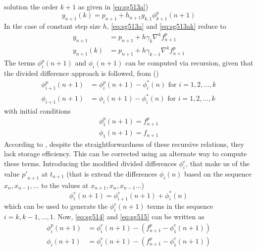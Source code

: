 solution the order $k+1$ as given in \autoref{eq:sg513a})
\begin{equation}\label{eq:sg513ak}
  y_{n+1}(k) = p_{n+1} + h_{n+1} g_{k,1} \phi ^{p}_{k+1} (n+1)
\end{equation}
In the case of constant step size $h$, \autoref{eq:sg513a} and \autoref{eq:sg513ak} 
reduce to
\begin{align}
  y_{n+1}    &= p_{n+1} + h \gamma _k \nabla ^{k} f^{p}_{n+1} \\
  y_{n+1}(k) &= p_{n+1} + h \gamma _{k-1} \nabla ^{k} f^{p}_{n+1}
\end{align}
The terms $\phi ^{p}_{i} (n+1)$ and $\phi _{i} (n+1)$ can be computed via recursion, 
given that the divided difference approach is followed, from (\cite{Shampine1975})
\begin{align}
  \phi ^{p}_{i+1} (n+1) &= \phi ^{p}_{i} (n+1) - \phi ^{*}_{i} (n) \mbox{  for } i=1,2,\dots ,k \label{eq:sg514}\\
  \phi _{i+1} (n+1)     &= \phi _{i} (n+1) - \phi ^{*}_{i} (n)     \mbox{  for } i=1,2,\dots ,k \label{eq:sg515}
\end{align}
with initial conditions
\begin{align}
  \phi ^{p}_{1} (n+1) = f_{n+1}^{p} \\
  \phi _{1} (n+1) = f_{n+1}
\end{align}
According to \cite{Shampine1975}, despite the straightforwardness of these recursive 
relations, they lack storage efficiency. This can be corrected using an alternate way 
to compute these terms. Introducing the modified divided differences $\phi ^{e}_{i}$, 
that make us of the value ${p'}_{n+1}$ at $t_{n+1}$ (that is extend the differences 
$\phi _i(n)$ based on the sequence $x_n, x_{n-1}, \dots$ to the values at 
$x_{n+1}, x_{n}, x_{n-1} \dots$)
\begin{equation}\label{eq:sg518}
  \phi ^{e}_{i}(n+1) = \phi ^{e}_{i+1} (n+1) + \phi^{*}_{i} (n)
\end{equation}
which can be used to generate the $\phi ^{e}_{i}(n+1)$ terms in the sequence 
$i=k, k-1, \dots ,1$. Now, \autoref{eq:sg514} and \autoref{eq:sg515} can be written as
\begin{align}
  \phi ^{p}_{i} (n+1) &= \phi ^{e}_{i} (n+1) - \left( f^{p}_{n+1} - \phi ^{e}_{1} (n+1) \right) \label{eq:sg519}\\
  \phi _{i} (n+1)     &= \phi ^{e}_{i} (n+1) - \left( f^{p}_{n+1} - \phi ^{e}_{1} (n+1) \right) \label{eq:sg520}
\end{align}

